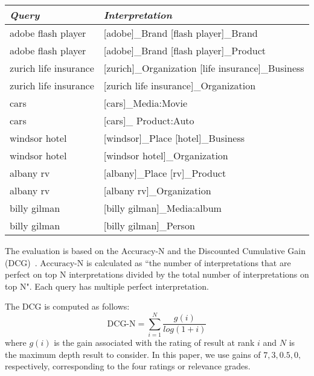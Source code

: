 \documentclass[11pt]{article}
\begin{document}
\begin{table*}
\begin{center}
\begin{tabular}{|l|l|} \hline
\it{Query} & \it{Interpretation} \\ \hline
adobe flash player &          [adobe]\_Brand  [flash player]\_Brand \\
adobe flash player   &     [adobe]\_Brand  [flash player]\_Product \\ \hline

zurich life insurance &    [zurich]\_Organization    [life insurance]\_Business \\ 
zurich life insurance   &   [zurich life insurance]\_Organization \\ \hline

cars   &  [cars]\_Media:Movie  \\ 
cars    &    [cars]\_ Product:Auto  \\ \hline

windsor hotel &   [windsor]\_Place      [hotel]\_Business   \\
windsor hotel &     [windsor hotel]\_Organization  \\ \hline

albany rv &    [albany]\_Place     [rv]\_Product \\
albany rv &         [albany rv]\_Organization  \\  \hline

billy gilman &    [billy gilman]\_Media:album \\
billy gilman  &  [billy gilman]\_Person   \\ \hline


\end{tabular}
\end{center}
\label{table:ambiguous queries}
\end{table*}

The evaluation is based on the $\text{Accuracy-N}$ and the Discounted Cumulative Gain (DCG)~\cite{NDCG2000}.
$\text{Accuracy-N}$ is calculated as ``the number of interpretations that are perfect on top N interpretations divided by the total  number of  interpretations on top N". Each query has multiple perfect interpretation.


The DCG is computed as follows:
\begin{equation}
\nonumber
\text{DCG-N} = \sum_{i=1}^{N} \frac{g(i)}{log(1+i)}
\end{equation}
where $g(i)$ is the gain associated with the rating of result at rank $i$ and $N$ is the maximum depth result to consider.  In this paper, we use gains of $7, 3, 0.5, 0,$  respectively, corresponding to the four ratings or relevance grades.
\end{document}
